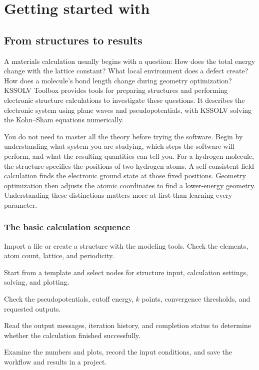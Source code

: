 \chapter{Getting started with }\label{ch:introduction}

\section{From structures to results}
A materials calculation usually begins with a question: How does the total energy change with the lattice constant? What local environment does a defect create? How does a molecule's bond length change during geometry optimization? KSSOLV Toolbox provides tools for preparing structures and performing electronic structure calculations to investigate these questions. It describes the electronic system using plane waves and pseudopotentials, with KSSOLV solving the Kohn--Sham equations numerically.

You do not need to master all the theory before trying the software. Begin by understanding what system you are studying, which steps the software will perform, and what the resulting quantities can tell you. For a hydrogen molecule, the structure specifies the positions of two hydrogen atoms. A self-consistent field calculation finds the electronic ground state at those fixed positions. Geometry optimization then adjusts the atomic coordinates to find a lower-energy geometry. Understanding these distinctions matters more at first than learning every parameter.

\subsection{The basic calculation sequence}
\begin{steps}
\item {} Import a file or create a structure with the modeling tools. Check the elements, atom count, lattice, and periodicity.
\item {} Start from a template and select nodes for structure input, calculation settings, solving, and plotting.
\item {} Check the pseudopotentials, cutoff energy, $k$ points, convergence thresholds, and requested outputs.
\item {} Read the output messages, iteration history, and completion status to determine whether the calculation finished successfully.
\item {} Examine the numbers and plots, record the input conditions, and save the workflow and results in a project.
\end{steps}

